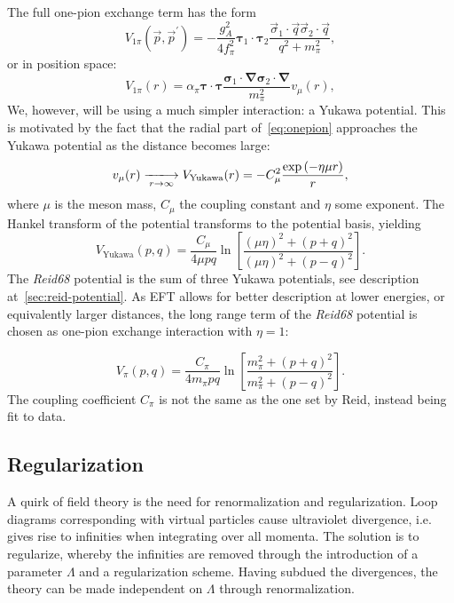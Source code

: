The full one-pion exchange term has the form
\begin{equation*}
  V_{1\pi}(\vec{p}, \vec{p}^{\prime}) = -\frac{g_{A}^{2}}{4f_{\pi}^{2}}\pmb{\tau}_{1}\cdot\pmb{\tau}_{2}
  \frac{\vec{\sigma}_{1}\cdot\vec{q}\vec{\sigma}_{2}\cdot\vec{q}}{q^{2}+m_{\pi}^{2}},
\end{equation*}
or in position space\cite[p.~30]{lepage1997renormalize}:
\begin{equation}
  \label{eq:onepion}
  V_{1\pi}(r) = \alpha_{\pi}\pmb{\tau}\cdot\pmb{\tau}\frac{\pmb{\sigma}_{1}\cdot\pmb{\nabla}\pmb{\sigma}_{2}\cdot\pmb{\nabla}}{m_{\pi}^{2}}
  v_{\mu}(r),
\end{equation}
We, however, will be using a much simpler interaction: a Yukawa potential. This
is motivated by the fact that the radial part of~\eqref{eq:onepion} approaches
the Yukawa potential as the distance becomes large:
\begin{equation*}
  v_{\mu}(r) \xlongrightarrow[r\to\infty]{} V_{\text{Yukawa}}(r) = -C_{\mu}^{2}\frac{\exp\left( -\eta\mu r \right)}{r},
\end{equation*}
where \(\mu\) is the meson mass, \(C_{\mu}\) the coupling constant and \(\eta\)
some exponent. The Hankel
transform of the potential transforms to the potential basis, yielding
\begin{equation*}
  V_{\text{Yukawa}}(p, q) = \frac{C_{\mu}}{4\mu pq}\ln\left[ \frac{(\mu\eta)^{2}+(p+q)^{2}}{(\mu\eta)^{2}+(p-q)^{2}} \right].
\end{equation*}
The \textit{Reid68} potential is the sum of three Yukawa potentials,
see description at~\autoref{sec:reid-potential}. As EFT allows for better
description at lower energies, or equivalently larger distances, the long range
term of the \textit{Reid68} potential is chosen as one-pion exchange
interaction with \(\eta=1\):

\begin{equation}
  \label{eq:pi}
  V_{\pi}(p, q) = \frac{C_{\pi}}{4m_{\pi} pq}\ln\left[ \frac{m_{\pi}^{2}+(p+q)^{2}}{m_{\pi}^{2}+(p-q)^{2}} \right].
\end{equation}
The coupling coefficient \(C_{\pi}\) is not the same as the one set by Reid,
instead being fit to data.


\subsection{Regularization}
A quirk of field theory is the need for renormalization and regularization. Loop
diagrams corresponding with virtual particles cause ultraviolet divergence, i.e.
gives rise to infinities when integrating over all momenta. The solution is to regularize,
whereby the infinities are removed through the introduction of a parameter
\(\Lambda\) and a regularization scheme. Having subdued the divergences, the
theory can be made independent on \(\Lambda\) through renormalization.

